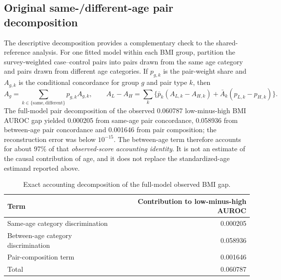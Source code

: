 \subsection{Original same-/different-age pair decomposition}
The descriptive decomposition provides a complementary check to the shared-reference analysis. For one fitted model within each BMI group, partition the survey-weighted case--control pairs into pairs drawn from the same age category and pairs drawn from different age categories. If $p_{g,k}$ is the pair-weight share and $A_{g,k}$ is the conditional concordance for group $g$ and pair type $k$, then
\begin{equation}\label{eq:pair-decomposition-restored}
A_g=\sum_{k\in\{\mathrm{same},\mathrm{different}\}}p_{g,k}A_{g,k},\qquad
A_L-A_H=\sum_k\!\bigl\{\bar p_k(A_{L,k}-A_{H,k})+\bar A_k(p_{L,k}-p_{H,k})\bigr\}.
\end{equation}
The full-model pair decomposition of the observed 0.060787 low-minus-high BMI AUROC gap yielded 0.000205 from same-age pair concordance, 0.058936 from between-age pair concordance and 0.001646 from pair composition; the reconstruction error was below $10^{-15}$. The between-age term therefore accounts for about 97\% of that \emph{observed-score accounting identity}. It is not an estimate of the causal contribution of age, and it does not replace the standardized-age estimand reported above.
\begin{table}[ht]\centering\small
\caption{Exact accounting decomposition of the full-model observed BMI gap.}
\begin{tabular}{lr}\toprule
Term & Contribution to low-minus-high AUROC\\\midrule
Same-age category discrimination & 0.000205\\
Between-age category discrimination & 0.058936\\
Pair-composition term & 0.001646\\\midrule
Total & 0.060787\\\bottomrule\end{tabular}\end{table}

